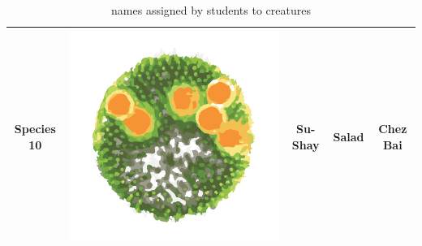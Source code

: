 \begin{table}
\begin{tabular}{ | c | c | c | c | c | }
Species 10 & \includegraphics[valign=m,scale=0.1]{images/species_10.png} & Su-Shay & Salad & Chez Bai \\ 
\hline
\end{tabular}
\caption{names assigned by students to creatures}
\label{tab:species_names}
\end{table}

